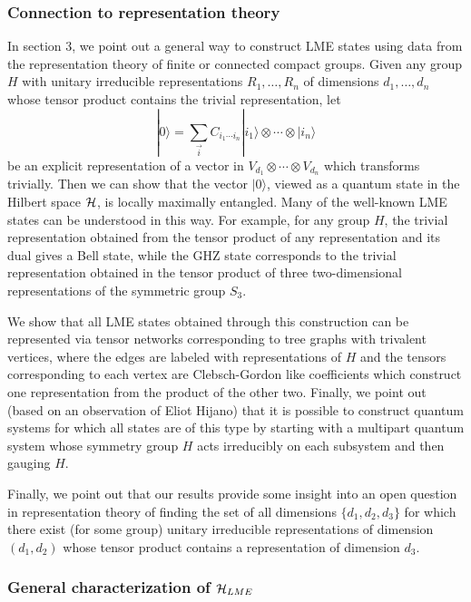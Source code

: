 \documentclass[12pt]{article}
\theoremstyle{definition}
\newcommand{\be}{\begin{equation}}
\newcommand{\ee}{\end{equation}}
\begin{document}
\subsubsection*{Connection to representation theory}

In section 3, we point out a general way to construct LME states using
data from the representation theory of finite or connected compact
groups. Given any group $H$ with unitary irreducible representations
$R_1,\dots ,R_n$ of dimensions $d_1, \dots, d_n$ whose tensor product
contains the trivial representation, let \be |0 \rangle =
\sum_{\vec{i}} C_{i_1 \cdots i_n} |i_1 \rangle  \otimes \cdots  \otimes
|i_n \rangle \ee be an explicit representation of a vector in $V_{d_1}
 \otimes \cdots  \otimes V_{d_n}$ which transforms trivially. Then we
can show that the vector $|0 \rangle$, viewed as a quantum state in
the Hilbert space ${\cal H}$, is locally maximally entangled. Many of
the well-known LME states can be understood in this way. For example,
for any group $H$, the trivial representation obtained from the tensor
product of any representation and its dual gives a Bell state, while
the GHZ state corresponds to the trivial representation obtained in
the tensor product of three two-dimensional representations of the
symmetric group $S_3$.

We show that all LME states obtained through this construction can be represented via tensor networks corresponding to tree graphs with trivalent vertices, where the edges are labeled with representations of $H$ and the tensors corresponding to each vertex are Clebsch-Gordon like coefficients which construct one representation from the product of the other two. Finally, we point out (based on an observation of Eliot Hijano) that it is possible to construct quantum systems for which all states are of this type by starting with a multipart quantum system whose symmetry group $H$ acts irreducibly on each subsystem and then gauging $H$.

Finally, we point out that our results provide some insight into an open question in representation theory of finding the set of all dimensions $\{d_1, d_2, d_3\}$ for which there exist (for some group) unitary irreducible representations of dimension $(d_1,d_2)$ whose tensor product contains a representation of dimension $d_3$.

\subsubsection*{General characterization of ${\cal H}_{LME}$}
\end{document}
